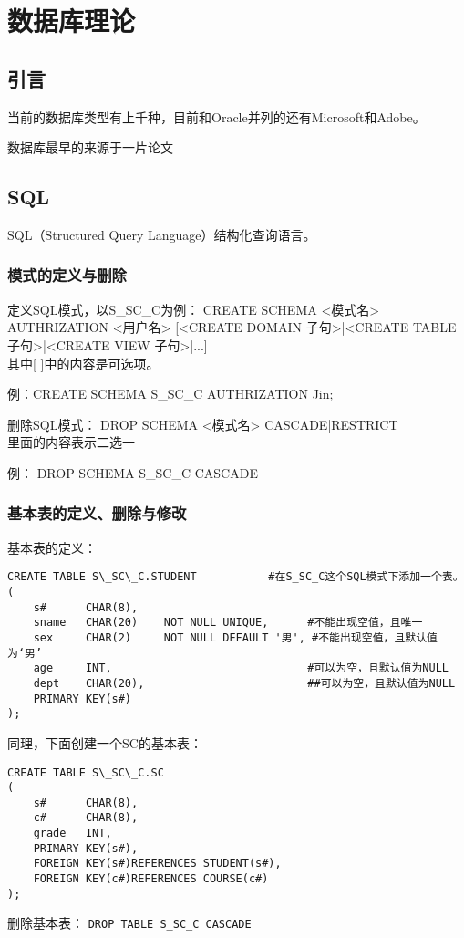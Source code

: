 \chapter{数据库理论}
\section{引言}
当前的数据库类型有上千种，目前和Oracle并列的还有Microsoft和Adobe。

数据库最早的来源于一片论文

\section{SQL}
SQL（Structured Query Language）结构化查询语言。
\subsection{模式的定义与删除}
定义SQL模式，以S\_SC\_C为例：
CREATE SCHEMA <模式名> AUTHRIZATION <用户名> [<CREATE DOMAIN 子句>|<CREATE TABLE 子句>|<CREATE VIEW 子句>|...]\\
其中[ ]中的内容是可选项。

例：CREATE SCHEMA S\_SC\_C AUTHRIZATION Jin;

删除SQL模式：
DROP SCHEMA <模式名> {CASCADE|RESTRICT}\\
{}里面的内容表示二选一

例： DROP SCHEMA S\_SC\_C CASCADE

\subsection{基本表的定义、删除与修改}
基本表的定义：

\begin{verbatim}
CREATE TABLE S\_SC\_C.STUDENT           #在S_SC_C这个SQL模式下添加一个表。
(
    s#      CHAR(8),
    sname   CHAR(20)    NOT NULL UNIQUE,      #不能出现空值，且唯一
    sex     CHAR(2)     NOT NULL DEFAULT '男', #不能出现空值，且默认值为‘男’
    age     INT,                              #可以为空，且默认值为NULL
    dept    CHAR(20),                         ##可以为空，且默认值为NULL
    PRIMARY KEY(s#)
);
\end{verbatim}
同理，下面创建一个SC的基本表：
\begin{verbatim}
CREATE TABLE S\_SC\_C.SC
(
    s#      CHAR(8),
    c#      CHAR(8),
    grade   INT,
    PRIMARY KEY(s#),
    FOREIGN KEY(s#)REFERENCES STUDENT(s#),
    FOREIGN KEY(c#)REFERENCES COURSE(c#)
);
\end{verbatim}

删除基本表：
\verb|DROP TABLE S_SC_C CASCADE| 